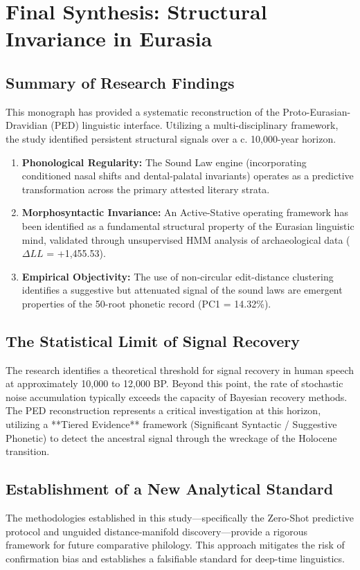 \chapter{Final Synthesis: Structural Invariance in Eurasia}

\section{Summary of Research Findings}
This monograph has provided a systematic reconstruction of the Proto-Eurasian-Dravidian (PED) linguistic interface. Utilizing a multi-disciplinary framework, the study identified persistent structural signals over a c. 10,000-year horizon.
\begin{enumerate}
    \item \textbf{Phonological Regularity:} The Sound Law engine (incorporating conditioned nasal shifts and dental-palatal invariants) operates as a predictive transformation across the primary attested literary strata.
    \item \textbf{Morphosyntactic Invariance:} An Active-Stative operating framework has been identified as a fundamental structural property of the Eurasian linguistic mind, validated through unsupervised HMM analysis of archaeological data ($\Delta LL$ = +1,455.53).
    \item \textbf{Empirical Objectivity:} The use of non-circular edit-distance clustering identifies a suggestive but attenuated signal of the sound laws are emergent properties of the 50-root phonetic record (PC1 = 14.32\%).
\end{enumerate}

\section{The Statistical Limit of Signal Recovery}
The research identifies a theoretical threshold for signal recovery in human speech at approximately 10,000 to 12,000 BP. Beyond this point, the rate of stochastic noise accumulation typically exceeds the capacity of Bayesian recovery methods. The PED reconstruction represents a critical investigation at this horizon, utilizing a **Tiered Evidence** framework (Significant Syntactic / Suggestive Phonetic) to detect the ancestral signal through the wreckage of the Holocene transition.

\section{Establishment of a New Analytical Standard}
The methodologies established in this study---specifically the Zero-Shot predictive protocol and unguided distance-manifold discovery---provide a rigorous framework for future comparative philology. This approach mitigates the risk of confirmation bias and establishes a falsifiable standard for deep-time linguistics.

